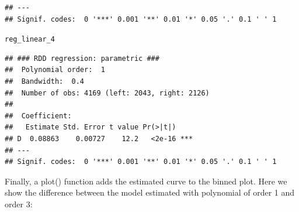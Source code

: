 \documentclass[english,nojss]{jss}\usepackage{graphicx, color}
\makeatletter
\newenvironment{kframe}{%
 \def\at@end@of@kframe{}%
 \ifinner\ifhmode%
  \def\at@end@of@kframe{\end{minipage}}%
  \begin{minipage}{\columnwidth}%
 \fi\fi%
 \def\FrameCommand##1{\hskip\@totalleftmargin \hskip-\fboxsep
 \colorbox{shadecolor}{##1}\hskip-\fboxsep
     \hskip-\linewidth \hskip-\@totalleftmargin \hskip\columnwidth}%
 \MakeFramed {\advance\hsize-\width
   \@totalleftmargin\z@ \linewidth\hsize
   \@setminipage}}%
 {\par\unskip\endMakeFramed%
 \at@end@of@kframe}
\newenvironment{knitrout}{}{} %
\makeatother
\begin{document}
\begin{knitrout}
\begin{kframe}
\begin{verbatim}
## ---
## Signif. codes:  0 '***' 0.001 '**' 0.01 '*' 0.05 '.' 0.1 ' ' 1
\end{verbatim}
\begin{alltt}
reg_linear_4
\end{alltt}
\begin{verbatim}
## ### RDD regression: parametric ###
## 	Polynomial order:  1 
## 	Bandwidth:  0.4 
## 	Number of obs: 4169 (left: 2043, right: 2126)
## 
## 	Coefficient:
##   Estimate Std. Error t value Pr(>|t|)    
## D  0.08863    0.00727    12.2   <2e-16 ***
## ---
## Signif. codes:  0 '***' 0.001 '**' 0.01 '*' 0.05 '.' 0.1 ' ' 1
\end{verbatim}
\end{kframe}
\end{knitrout}


Finally, a plot() function adds the estimated curve to the binned
plot. Here we show the difference between the model estimated with
polynomial of order 1 and order 3:
\end{document}
